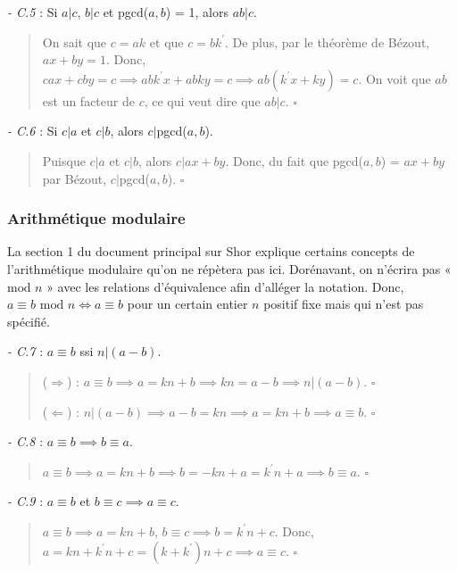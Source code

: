 \textit{- C.5} : Si $a|c$, $b|c$ et pgcd($a,b$) = 1, alors $ab|c$.

\begin{quote}
    On sait que $c = ak$ et que $c = bk^{'}$. De plus, par le théorème de Bézout, $ax + by = 1$. Donc, $cax + cby = c \implies abk^{'}x + abky = c \implies ab(k^{'}x + ky) = c$. On voit que $ab$ est un facteur de $c$, ce qui veut dire que $ab|c$. $\square$ 
\end{quote}

\textit{- C.6} : Si $c|a$ et $c|b$, alors $c|$pgcd($a,b$).

\begin{quote}
    Puisque $c|a$ et $c|b$, alors $c|ax+by$. Donc, du fait que pgcd($a,b$) = $ax+by$ par Bézout, $c|$pgcd($a,b$). $\square$
\end{quote}

\subsubsection*{Arithmétique modulaire}
La section 1 du document principal sur Shor explique certains concepts de l'arithmétique modulaire qu'on ne répètera pas ici. Dorénavant, on n'écrira pas « $\text{mod } n$ » avec les relations d'équivalence afin d'alléger la notation. Donc, $a \equiv b \text{ mod } n \iff a \equiv b$ pour un certain entier $n$ positif fixe mais qui n'est pas spécifié.

\textit{- C.7} : $a \equiv b$ ssi $n|(a-b)$.

\begin{quote}
    (\textit{$\Longrightarrow$}) : $a \equiv b \implies a = kn + b \implies kn = a-b \implies n|(a-b)$. $\square$        

    (\textit{$\Longleftarrow$}) : $n|(a-b) \implies a-b = kn \implies a = kn + b \implies a \equiv b$. $\square$        
\end{quote}

\textit{- C.8} : $a \equiv b \implies b \equiv a$.

\begin{quote}
    $a \equiv b \implies a = kn + b \implies b = -kn + a = k^{'}n + a \implies b \equiv a$. $\square$
\end{quote}

\textit{- C.9} : $a \equiv b$ et $b \equiv c \implies a \equiv c$.

\begin{quote}
    $a \equiv b \implies a = kn + b$, $b \equiv c \implies b = k^{'}n +c$. Donc, $a = kn + k^{'}n + c = (k + k^{'})n + c \implies a \equiv c$. $\square$
\end{quote}

